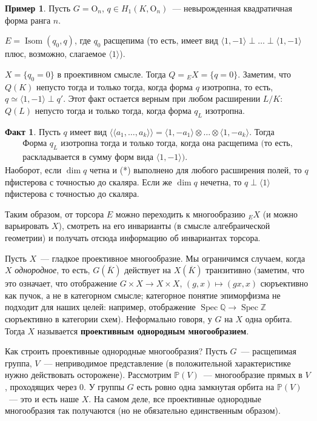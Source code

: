 \documentclass[a4paper]{article}
\DeclareMathOperator{\Spec}{Spec}
\DeclareMathOperator{\Isom}{Isom}
\renewcommand{\O}{\mathrm{O}}
\newcommand{\term}{\textbf}
\newcommand{\isom}{\simeq}
\theoremstyle{definition}
\newtheorem{example}[theorem]{Пример}
\newtheorem{fact}[theorem]{Факт}
\newcommand{\la}{\langle}
\newcommand{\ra}{\rangle}
\newcommand{\lAngle}{\langle\!\langle}
\newcommand{\rAngle}{\rangle\!\rangle}
\begin{document}
\begin{example}
Пусть $G=\O_n$, $q\in H_1(K,\O_n)$~--- невырожденная квадратичная
форма ранга $n$.

$E=\Isom(q_0,q)$, где $q_0$ расщепима (то есть, имеет
вид $\langle 1,-1\rangle\perp\dots\perp\langle 1,-1\rangle$ плюс,
возможно, слагаемое $\langle 1\rangle$).

$X=\{q_0=0\}$ в проективном смысле. Тогда $Q={}_EX=\{q=0\}$. Заметим,
что  $Q(K)$ непусто тогда и только тогда, когда форма $q$ изотропна, то
есть, $q\isom\langle 1,-1\rangle\perp q'$. Этот факт остается верным
при любом расширении $L/K$: $Q(L)$ непусто тогда и только тогда, когда
форма $q_L$ изотропна.
\end{example}

\begin{fact}
Пусть $q$ имеет вид $\lAngle a_1,\dots,a_k\rAngle=\la
1,-a_1\ra\otimes\dots\otimes\la 1,-a_k\ra$. Тогда
\begin{multline}
\text{
Форма $q_L$ изотропна тогда и только тогда, когда она расщепима (то
есть,} \\
\text{раскладывается в сумму форм вида $\la 1,-1\ra$).}\tag{*}
\end{multline}
Наоборот, если $\dim q$ четна и (*) выполнено для любого расширения
полей, то $q$ пфистерова с точностью до скаляра. Если же $\dim q$
нечетна, то $q\perp\la 1\ra$ пфистерова с точностью до скаляра.
\end{fact}

Таким образом, от торсора $E$ можно переходить к многообразию ${}_EX$
(и можно варьировать $X$), смотреть на его инварианты (в смысле
алгебраической геометрии) и получать отсюда информацию об инвариантах
торсора.

Пусть $X$~--- гладкое проективное многообразие. Мы ограничимся
случаем, когда $X$ \emph{однородное}, то есть, $G(\overline{K})$
действует на $X(\overline{K})$ транзитивно (заметим, что это означает,
что отображение $G\times X\to X\times X$, $(g,x)\mapsto (gx,x)$
сюръективно как пучок, а не в категорном смысле; категорное понятие
эпиморфизма не подходит для наших целей: например, отображение
$\Spec{\mathbb Q}\to\Spec{\mathbb Z}$ сюръективно в категории схем).
Неформально говоря, у $G$ на $X$ одна орбита.
Тогда $X$ называется \term{проективным однородным многообразием}.

Как строить проективные однородные многообразия? Пусть $G$~---
расщепимая группа, $V$~--- неприводимое представление (в положительной
характеристике нужно действовать осторожене). Рассмотрим $\mathbb
P(V)$~--- многообразие прямых в $V$, проходящих через $0$. У группы
$G$ есть ровно одна замкнутая орбита на $\mathbb P(V)$~--- это и есть
наше $X$. На самом деле, все проективные однородные многообразия так
получаются (но не обязательно единственным образом).
\end{document}
